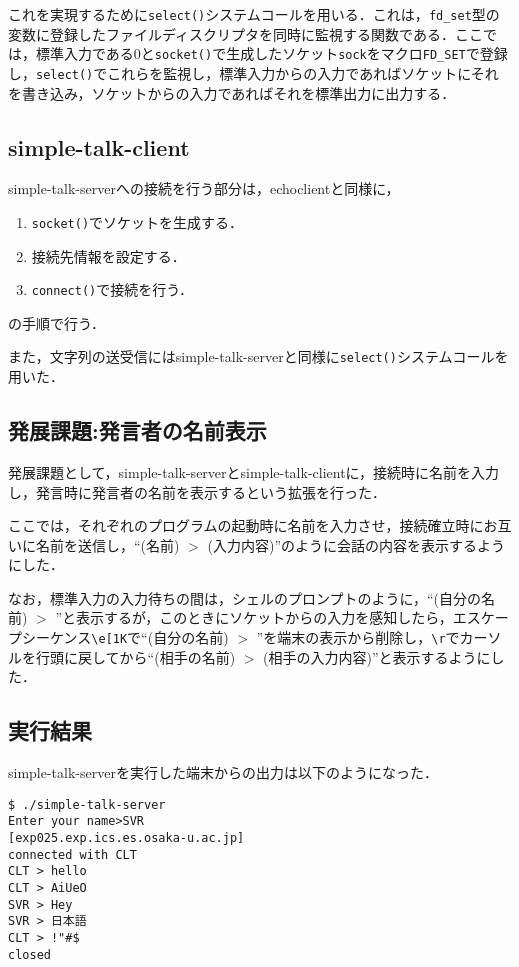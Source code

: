 \documentclass[a4j,10pt,titlepage]{jsarticle}
\begin{document}
これを実現するために\verb|select()|システムコールを用いる．これは，\verb|fd_set|型の変数に登録したファイルディスクリプタを同時に監視する関数である．ここでは，標準入力である0と\verb|socket()|で生成したソケット\verb|sock|をマクロ\verb|FD_SET|で登録し，\verb|select()|でこれらを監視し，標準入力からの入力であればソケットにそれを書き込み，ソケットからの入力であればそれを標準出力に出力する．

\subsection{simple-talk-client}
simple-talk-serverへの接続を行う部分は，echoclientと同様に，
\begin{enumerate}
	\item \verb|socket()|でソケットを生成する．
	\item 接続先情報を設定する．
	\item \verb|connect()|で接続を行う．
\end{enumerate}
の手順で行う．

また，文字列の送受信にはsimple-talk-serverと同様に\verb|select()|システムコールを用いた．

\subsection{発展課題:発言者の名前表示}
発展課題として，simple-talk-serverとsimple-talk-clientに，接続時に名前を入力し，発言時に発言者の名前を表示するという拡張を行った．

ここでは，それぞれのプログラムの起動時に名前を入力させ，接続確立時にお互いに名前を送信し，``(名前) $>$ (入力内容)''のように会話の内容を表示するようにした．

なお，標準入力の入力待ちの間は，シェルのプロンプトのように，``(自分の名前) $>$ ''と表示するが，このときにソケットからの入力を感知したら，エスケープシーケンス\verb|\e[1K|で``(自分の名前) $>$ ''を端末の表示から削除し，\verb|\r|でカーソルを行頭に戻してから``(相手の名前) $>$ (相手の入力内容)''と表示するようにした．
	
	\subsection{実行結果}
	simple-talk-serverを実行した端末からの出力は以下のようになった．
	\begin{verbatim}
$ ./simple-talk-server
Enter your name>SVR
[exp025.exp.ics.es.osaka-u.ac.jp]
connected with CLT
CLT > hello
CLT > AiUeO
SVR > Hey
SVR > 日本語
CLT > !"#$
closed
	\end{verbatim}
	
\end{document}
